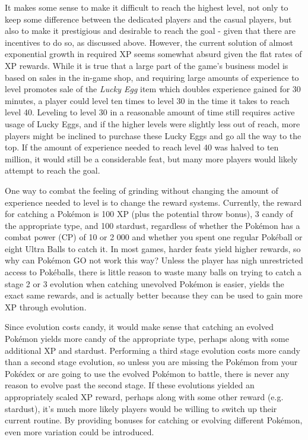 It makes some sense to make it difficult to reach the highest level, not only to keep some difference between the dedicated players and the casual players, but also to make it prestigious and desirable to reach the goal - given that there are incentives to do so, as discussed above. However, the current solution of almost exponential growth in required XP seems somewhat absurd given the flat rates of XP rewards. While it is true that a large part of the game's business model is based on sales in the in-game shop, and requiring large amounts of experience to level promotes sale of the \emph{Lucky Egg} item which doubles experience  gained for 30 minutes, a player could level ten times to level 30 in the time it takes to reach level 40. Leveling to level 30 in a reasonable amount of time still requires active usage of Lucky Eggs, and if the higher levels were slightly less out of reach, more players might be inclined to purchase these Lucky Eggs and go all the way to the top. If the amount of experience needed to reach level 40 was halved to ten million, it would still be a considerable feat, but many more players would likely attempt to reach the goal.

One way to combat the feeling of grinding without changing the amount of experience needed to level is to change the reward systems. Currently, the reward for catching a Pokémon is 100 XP (plus the potential throw bonus), 3 candy of the appropriate type, and 100 stardust, regardless of whether the Pokémon has a combat power (CP) of 10 or 2 000 and whether you spent one regular Pokéball or eight Ultra Balls to catch it. In most games, harder feats yield higher rewards, so why can Pokémon GO not work this way? Unless the player has nigh unrestricted access to Pokéballs, there is little reason to waste many balls on trying to catch a stage 2 or 3 evolution when catching unevolved Pokémon is easier, yields the exact same rewards, and is actually better because they can be used to gain more XP through evolution.

Since evolution costs candy, it would make sense that catching an evolved Pokémon yields more candy of the appropriate type, perhaps along with some additional XP and stardust. Performing a third stage evolution costs more candy than a second stage evolution, so unless you are missing the Pokémon from your Pokédex or are going to use the evolved Pokémon to battle, there is never any reason to evolve past the second stage. If these evolutions yielded an appropriately scaled XP reward, perhaps along with some other reward (e.g. stardust), it's much more likely players would be willing to switch up their current routine. By providing bonuses for catching or evolving different Pokémon, even more variation could be introduced.


